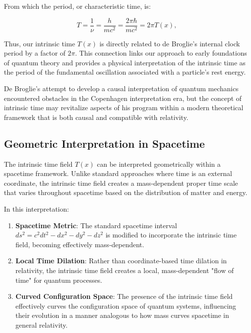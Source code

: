 \documentclass[12pt,a4paper]{article}
\newcommand{\Tfield}{T(x)}
\begin{document}
	From which the period, or characteristic time, is:
	
	\begin{equation}
		T = \frac{1}{\nu} = \frac{h}{mc^2} = \frac{2\pi\hbar}{mc^2} = 2\pi \Tfield,
		\label{eq:debroglie_period}
	\end{equation}
	
	Thus, our intrinsic time $\Tfield$ is directly related to de Broglie's internal clock period by a factor of $2\pi$. This connection links our approach to early foundations of quantum theory and provides a physical interpretation of the intrinsic time as the period of the fundamental oscillation associated with a particle's rest energy.
	
	De Broglie's attempt to develop a causal interpretation of quantum mechanics \cite{deBroglie1927, deBroglie1930} encountered obstacles in the Copenhagen interpretation era, but the concept of intrinsic time may revitalize aspects of his program within a modern theoretical framework that is both causal and compatible with relativity.
	
	\subsection{Geometric Interpretation in Spacetime}
	\label{subsec:geometric_interpretation}
	
	The intrinsic time field $\Tfield$ can be interpreted geometrically within a spacetime framework. Unlike standard approaches where time is an external coordinate, the intrinsic time field creates a mass-dependent proper time scale that varies throughout spacetime based on the distribution of matter and energy.
	
	In this interpretation:
	
	\begin{enumerate}
		\item \textbf{Spacetime Metric}: The standard spacetime interval $ds^2 = c^2dt^2 - dx^2 - dy^2 - dz^2$ is modified to incorporate the intrinsic time field, becoming effectively mass-dependent.
		
		\item \textbf{Local Time Dilation}: Rather than coordinate-based time dilation in relativity, the intrinsic time field creates a local, mass-dependent "flow of time" for quantum processes.
		
		\item \textbf{Curved Configuration Space}: The presence of the intrinsic time field effectively curves the configuration space of quantum systems, influencing their evolution in a manner analogous to how mass curves spacetime in general relativity.
	\end{enumerate}
	
\end{document}
